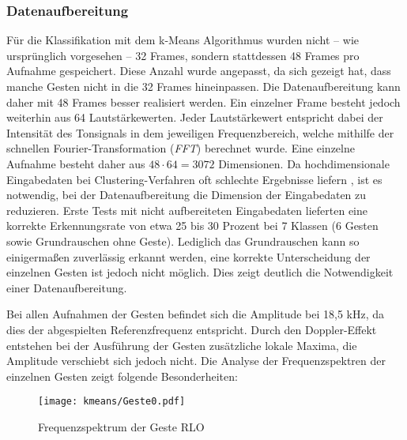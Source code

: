 \subsubsection{Datenaufbereitung}\label{subsubsec:Datenaufbereitung}
Für die Klassifikation mit dem k-Means Algorithmus wurden nicht -- wie ursprünglich vorgesehen -- 32 Frames, sondern stattdessen 48 Frames pro Aufnahme gespeichert. 
Diese Anzahl wurde angepasst, da sich gezeigt hat, dass manche Gesten nicht in die 32 Frames hineinpassen. Die Datenaufbereitung kann daher mit 48 Frames besser realisiert werden.
Ein einzelner Frame besteht jedoch weiterhin aus 64 Lautstärkewerten.
Jeder Lautstärkewert entspricht dabei der Intensität des Tonsignals in dem jeweiligen Frequenzbereich, welche mithilfe der schnellen Fourier-Transformation (\emph{FFT}) \cite{fftMathebuch} berechnet wurde. Eine einzelne Aufnahme besteht daher aus $48 \cdot 64 = 3072$ Dimensionen.  Da hochdimensionale Eingabedaten bei Clustering-Verfahren oft schlechte Ergebnisse liefern \cite{kMeansHighDimensions}, ist es notwendig, bei der Datenaufbereitung die Dimension der Eingabedaten zu reduzieren.  Erste Tests mit nicht aufbereiteten 
Eingabedaten lieferten eine korrekte Erkennungsrate von etwa 25 bis 30 Prozent bei 7 Klassen (6 Gesten sowie Grundrauschen ohne Geste). Lediglich das Grundrauschen kann so einigermaßen zuverlässig erkannt werden, eine korrekte Unterscheidung der einzelnen Gesten ist jedoch nicht möglich. Dies zeigt deutlich die Notwendigkeit einer Datenaufbereitung.

Bei allen Aufnahmen der Gesten befindet sich die Amplitude bei 18,5 kHz, da dies der abgespielten Referenzfrequenz entspricht. Durch den Doppler-Effekt entstehen bei der Ausführung der Gesten zusätzliche lokale Maxima, die Amplitude verschiebt sich jedoch nicht.
Die Analyse der Frequenzspektren der einzelnen Gesten zeigt folgende Besonderheiten:

\begin{figure*}[htbp]
    \centering
   \texttt{[image: kmeans/Geste0.pdf]}
\caption{Frequenzspektrum der Geste \ac{RLO}}
\label{fig:kMeansGeste0}
\end{figure*}

